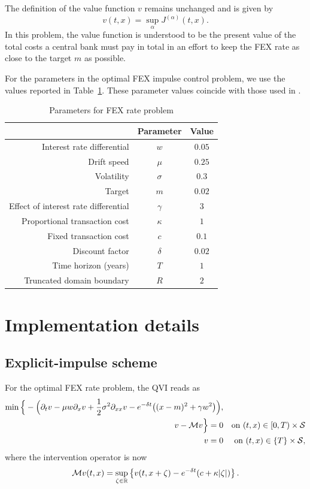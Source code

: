 The definition of the value function $v$ remains unchanged and is given by
\begin{equation*}
    v(t,x) = \sup_{\alpha} J^{(\alpha)}(t,x).
\end{equation*}
In this problem, the value function is understood to be the present value of the total costs a central bank must pay in total in an effort to keep the FEX rate as close to the target $m$ as possible. 

For the parameters in the optimal FEX impulse control problem, we use the values reported in Table~\ref{tab: FEX rate params}. These parameter values coincide with those used in \cite{azimzadeh2018impulsecontrolfinancenumerical}.
\begin{table}[H]
    \centering
    \begin{tabular}{rcc}
        \toprule
        & Parameter & Value \\
        \hline
        Interest rate differential & $w$ & $0.05$ \\
        Drift speed & $\mu$ & $0.25$ \\
        Volatility & $\sigma$ & $0.3$ \\
        Target & $m$ & $0.02$ \\
        Effect of interest rate differential & $\gamma$ & $3$ \\
        Proportional transaction cost & $\kappa$ & $1$ \\
        Fixed transaction cost & $c$ & $0.1$ \\
        Discount factor & $\delta$ & $0.02$ \\
        Time horizon (years) & $T$ & $1$ \\
        Truncated domain boundary & $R$ & $2$ \\
        \toprule
    \end{tabular}
    \caption{Parameters for FEX rate problem}
    \label{tab: FEX rate params}
\end{table}

\section{Implementation details}
\subsection{Explicit-impulse scheme}
For the optimal FEX rate problem, the QVI reads as
\begin{align*}
    \min \Big\{ - \Big( \partial_t v - \mu w \partial_x v + \frac{1}{2} \sigma^2 \partial_{xx} v - e^{-\delta t} \big( (x-m)^2 + \gamma w^2 \big) \Big), \\
    v - \mathcal{M} v \Big\} = 0 && \text{on } (t,x) \in [0,T) \times \mathcal{S} \\
    v = 0 && \text{on } (t,x) \in \{T\} \times \mathcal{S},
\end{align*}
where the intervention operator is now
\begin{equation*}
    \mathcal{M} v(t,x) = \sup_{\zeta \in \mathbb{R}} \left\{ v(t,x+\zeta) - e^{-\delta t}(c+\kappa |\zeta|) \right\}.
\end{equation*}

